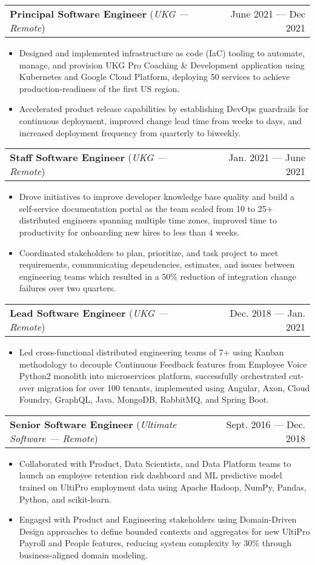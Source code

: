 \documentclass[letterpaper,10pt]{article}
\makeatletter
\newcommand{\experienceHeading}[4]{
  \item
    \begin{tabular*}{\textwidth}[t]{l@{\extracolsep{\fill}}r}
      \textbf{#1} (\textit{\small#3 --- \textit{\small #4}})& #2 \\
    \end{tabular*}\vspace{-4pt}
}
\newcommand{\experienceStart}{\begin{itemize}[leftmargin=16pt, rightmargin=8pt]}
\newcommand{\experienceEnd}{\end{itemize}\vspace{-7pt}}
\newcommand{\experience}[1]{\item\small{{#1 \vspace{-0.5pt}}}}
\makeatother
\begin{document}
  \experienceHeading{Principal Software Engineer}
    {June 2021 --- Dec 2021}
    {UKG}
    {Remote}
  \experienceStart{}
    \experience{
      Designed and implemented infrastructure as code (IaC) tooling to automate, manage, and provision UKG Pro Coaching \& Development application using Kubernetes and Google Cloud Platform, deploying 50 services to achieve production-readiness of the first US region.
    }
    \experience{
      Accelerated product release capabilities by establishing DevOps guardrails for continuous deployment, improved change lead time from weeks to days, and increased deployment frequency from quarterly to biweekly.
    }
  \experienceEnd{}

  \experienceHeading{Staff Software Engineer}
    {Jan. 2021 --- June 2021}
    {UKG}
    {Remote}
  \experienceStart{}
    \experience{
      Drove initiatives to improve developer knowledge base quality and build a self-service documentation portal as the team scaled from 10 to 25+ distributed engineers spanning multiple time zones, improved time to productivity for onboarding new hires to less than 4 weeks.
    }
    \experience{
      Coordinated stakeholders to plan, prioritize, and task project to meet requirements, communicating dependencies, estimates, and issues between engineering teams which resulted in a 50\% reduction of integration change failures over two quarters.
    }
  \experienceEnd{}

  \experienceHeading{Lead Software Engineer}
    {Dec. 2018 --- Jan. 2021}
    {UKG}
    {Remote}
  \experienceStart{}
    \experience{
      Led cross-functional distributed engineering teams of 7+ using Kanban methodology to decouple Continuous Feedback features from Employee Voice Python2 monolith into microservices platform, successfully orchestrated cut-over migration for over 100 tenants, implemented using Angular, Axon, Cloud Foundry, GraphQL, Java, MongoDB, RabbitMQ, and Spring Boot.
    }
  \experienceEnd{}

  \experienceHeading{Senior Software Engineer}
    {Sept. 2016 --- Dec. 2018}
    {Ultimate Software}
    {Remote}
  \experienceStart{}
    \experience{
      Collaborated with Product, Data Scientists, and Data Platform teams to launch an employee retention risk dashboard and ML predictive model trained on UltiPro employment data using Apache Hadoop, NumPy, Pandas, Python, and scikit-learn.
    }
    \experience{
      Engaged with Product and Engineering stakeholders using Domain-Driven Design approaches to define bounded contexts and aggregates for new UltiPro Payroll and People features, reducing system complexity by 30\% through business-aligned domain modeling.
    }
  \experienceEnd{}
\end{document}
